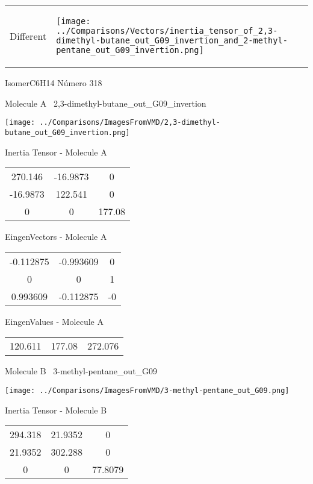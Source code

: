 \vtab[-5mm]
\begin{tabular}{*{2}{m{}}}
\begin{center}
\textcolor{NavyBlue}{\Large Different}
\end{center}
&
\begin{center}
\texttt{[image: ../Comparisons/Vectors/inertia\_tensor\_of\_2,3-dimethyl-butane\_out\_G09\_invertion\_and\_2-methyl-pentane\_out\_G09\_invertion.png]}
\end{center}
\end{tabular}

 \newpage

\vtab[-3cm]
\begin{center}
{\large IsomerC6H14 \tab Número 318}
\end{center}
\begin{multicols}{2}
\begin{center}

Molecule A \
2,3-dimethyl-butane\_out\_G09\_invertion

\texttt{[image: ../Comparisons/ImagesFromVMD/2,3-dimethyl-butane\_out\_G09\_invertion.png]}

Inertia Tensor - Molecule A \\
\begin{tabular}{|c c c|}
270.146	 & 	-16.9873	 & 	0	 \\
-16.9873	 & 	122.541	 & 	0	 \\
0	 & 	0	 & 	177.08
\end{tabular}

\vtab
 EingenVectors - Molecule A     \\
\begin{tabular}{|c c c|}
-0.112875	 & 	-0.993609	 & 	0	 \\
0	 & 	0	 & 	1	 \\
0.993609	 & 	-0.112875	 & 	-0
\end{tabular}

\vtab
 EingenValues - Molecule A     \\
\begin{tabular}{|c c c|}
120.611	 & 	177.08	 & 	272.076	 \\
\end{tabular}
\columnbreak

Molecule B \
3-methyl-pentane\_out\_G09

\texttt{[image: ../Comparisons/ImagesFromVMD/3-methyl-pentane\_out\_G09.png]}

Inertia Tensor - Molecule B \\
\begin{tabular}{|c c c|}
294.318	 & 	21.9352	 & 	0	 \\
21.9352	 & 	302.288	 & 	0	 \\
0	 & 	0	 & 	77.8079
\end{tabular}


\end{center}
\end{multicols}
